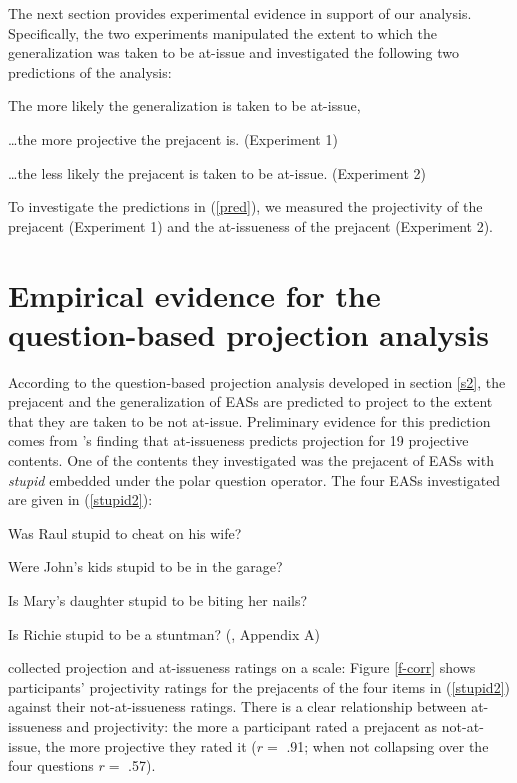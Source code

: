 \documentclass[11pt,fleqn]{article}
\newcommand{\6}{\mbox{$[\hspace*{-.6mm}[$}}
\newcommand{\9}{\mbox{$]\hspace*{-.6mm}]$}}
\newcommand{\citepos}[1]{\citeauthor{#1}'s \citeyear{#1}}
\begin{document}
The next section provides experimental evidence in support of our analysis. Specifically, the two experiments manipulated the extent to which the generalization was taken to be at-issue and investigated the following two predictions of the analysis:

\begin{exe}
\ex\label{pred} The more likely the generalization is taken to be at-issue,
\begin{xlist}
\ex \ldots the more projective the prejacent is. (Experiment 1)

\ex \ldots the less likely the prejacent is taken to be at-issue. (Experiment 2)

\end{xlist}
\end{exe}
To investigate the predictions in (\ref{pred}), we measured the projectivity of the prejacent (Experiment 1) and the at-issueness of the prejacent (Experiment 2).

\section{Empirical evidence for the question-based projection analysis}\label{s3}

According to the question-based projection analysis developed in section \ref{s2}, the prejacent and the generalization of EASs are predicted to project to the extent that they are taken to be not at-issue. Preliminary evidence for this prediction comes from \citepos{tbd-variability} finding that at-issueness predicts projection for 19 projective contents. One of the contents they investigated was the prejacent of EASs with {\em stupid} embedded under the polar question operator. The four EASs investigated are given in (\ref{stupid2}):

\begin{exe}
\ex\label{stupid2}

\begin{xlist}

\ex Was Raul stupid to cheat on his wife?

\ex Were John's kids stupid to be in the garage?

\ex Is Mary's daughter stupid to be biting her nails?

\ex Is Richie stupid to be a stuntman? \hfill (\citealt{tbd-variability}, Appendix A)

\end{xlist}

\end{exe}
\citet{tbd-variability} collected projection and at-issueness ratings on a scale: Figure \ref{f-corr} shows participants' projectivity ratings for the prejacents of the four items in (\ref{stupid2}) against their not-at-issueness ratings. There is a clear relationship between at-issueness and projectivity: the more a participant rated a prejacent as not-at-issue, the more projective they rated it ($r =$ .91; when not collapsing over the four questions $r =$ .57). 
\end{document}
